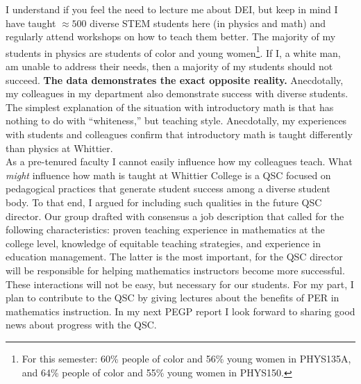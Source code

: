 \documentclass[../../../main.tex]{subfiles}
\begin{document}
I understand if you feel the need to lecture me about DEI, but keep in mind I have taught $\approx 500$ diverse STEM students here (in physics and math) and regularly attend workshops on how to teach them better.  The majority of my students in physics are students of color and young women\footnote{For this semester: 60\% people of color and 56\% young women in PHYS135A, and 64\% people of color and 55\% young women in PHYS150.}.  If I, a white man, am unable to address their needs, then a majority of my students should not succeed.  \textbf{The data demonstrates the exact opposite reality.} Anecdotally, my colleagues in my department also demonstrate success with diverse students.  The simplest explanation of the situation with introductory math is that has nothing to do with ``whiteness,'' but teaching style.  Anecdotally, my experiences with students and colleagues confirm that introductory math is taught differently than physics at Whittier.
\\
\vspace{0.25cm}
As a pre-tenured faculty I cannot easily influence how my colleagues teach.  What \textit{might} influence how math is taught at Whittier College is a QSC focused on pedagogical practices that generate student success among a diverse student body.  To that end, I argued for including such qualities in the future QSC director.  Our group drafted with consensus a job description that called for the following characteristics: proven teaching experience in mathematics at the college level, knowledge of equitable teaching strategies, and experience in education management.  The latter is the most important, for the QSC director will be responsible for helping mathematics instructors become more successful.  These interactions will not be easy, but necessary for our students.  For my part, I plan to contribute to the QSC by giving lectures about the benefits of PER in mathematics instruction.  In my next PEGP report I look forward to sharing good news about progress with the QSC.
\end{document}
